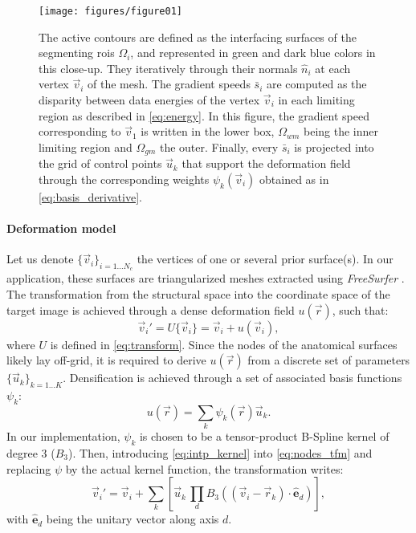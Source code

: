 \begin{figure}
	\texttt{[image: figures/figure01]}
	\caption{The active contours are defined as the interfacing surfaces of the segmenting
	\glspl{roi} $\Omega_i$, and represented in green and dark blue colors in this
	close-up.
	They iteratively through their normals $\hat{n}_i$ at each vertex $\vec{v}_i$ of the mesh.
	The gradient speeds $\bar{s}_i$ are computed as the disparity between data energies of
	the vertex $\vec{v}_i$ in each limiting region as described in \autoref{eq:energy}.
	In this figure, the gradient speed corresponding to $\vec{v}_1$ is written in the lower
	box, $\Omega_{wm}$ being the inner limiting region and $\Omega_{gm}$ the outer.
	Finally, every $\bar{s}_i$ is projected into the grid of control points $\vec{u}_k$ that
	support the deformation field through the corresponding weights $\psi_k(\vec{v}_i)$ obtained
	as in \autoref{eq:basis_derivative}.
	}\label{fig:method}
\end{figure}

\paragraph*{Deformation model}
\label{sec:deformation_model}
Let us denote $\{\vec{v}_i\}_{i=1 \ldots N_c}$ the vertices of one or several prior
  surface(s).
In our application, these surfaces are triangularized meshes extracted using \emph{FreeSurfer}
  \citep{fischl_freesurfer_2012}.
The transformation from the structural space into the coordinate space of the
  target image is achieved through a dense deformation field $u(\vec{r})$, such that:
  \begin{equation}
  \vec{v}_i' = U\{\vec{v}_i\} = \vec{v}_i + u(\vec{v}_i),
  \label{eq:nodes_tfm}
  \end{equation}
  where $U$ is defined in \eqref{eq:transform}.
Since the nodes of the anatomical surfaces likely lay off-grid, it is required to
  derive $u(\vec{r})$ from a discrete set of parameters $\{\vec{u}_k\}_{k=1 \ldots K}$.
Densification is achieved through a set of associated basis functions $\psi_k$:
  \begin{equation}
  u(\vec{r}) = \sum_k \psi_k(\vec{r}) \vec{u}_k.
  \label{eq:intp_kernel}
  \end{equation}
%
In our implementation, $\psi_k$ is chosen to be a tensor-product B-Spline kernel
  of degree 3 ($B_3$).
Then, introducing \eqref{eq:intp_kernel} into \eqref{eq:nodes_tfm} and replacing
  $\psi$ by the actual kernel function, the transformation writes:
  \begin{equation}
    \vec{v}_i' = \vec{v}_i + \sum_k \left[ \vec{u}_k \, \underset{d}{\prod}
      B_3( (\vec{v}_i - \vec{r}_k) \cdot \hat{\mathbf{e}}_d ) \right],
  \label{eq:transformation}
  \end{equation}
  with $\hat{\mathbf{e}}_d$ being the unitary vector along axis $d$.


